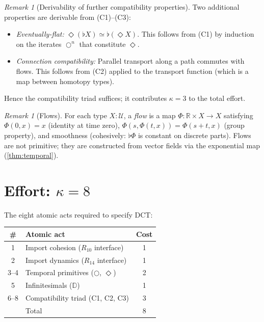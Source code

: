 \documentclass[11pt,a4paper]{article}
\theoremstyle{plain}
\theoremstyle{definition}
\theoremstyle{remark}
\newtheorem{remark}[theorem]{Remark}
\newcommand{\R}{\mathbb{R}}
\newcommand{\D}{\mathbb{D}}
\newcommand{\U}{\mathcal{U}}
\begin{document}
\begin{remark}[Derivability of further compatibility properties]
\label{rem:derivable}
Two additional properties are derivable from (C1)--(C3):
\begin{itemize}[nosep]
    \item \emph{Eventually-flat:} $\Diamond(\flat X) \simeq \flat(\Diamond X)$.
    This follows from (C1) by induction on the iterates $\bigcirc^n$ that constitute $\Diamond$.
    \item \emph{Connection compatibility:} Parallel transport along a path commutes with flows.
    This follows from (C2) applied to the transport function (which is a map between homotopy types).
\end{itemize}
Hence the compatibility triad suffices; it contributes $\kappa = 3$ to the total effort.
\end{remark}

\begin{remark}[Flows]
\label{rem:flows}
For each type $X : \U$, a \emph{flow} is a map $\Phi : \R \times X \to X$ satisfying $\Phi(0, x) = x$ (identity at time zero), $\Phi(s, \Phi(t, x)) = \Phi(s+t, x)$ (group property), and smoothness (cohesively: $\flat\Phi$ is constant on discrete parts).
Flows are not primitive; they are constructed from vector fields via the exponential map (\cref{thm:temporal}).
\end{remark}

\section{Effort: $\kappa = 8$}
\label{sec:kappa}

The eight atomic acts required to specify DCT:

\begin{center}
\begin{tabular}{@{}clc@{}}
\toprule
\# & Atomic act & Cost \\
\midrule
1 & Import cohesion ($R_{10}$ interface) & 1 \\
2 & Import dynamics ($R_{14}$ interface) & 1 \\
3--4 & Temporal primitives ($\bigcirc$, $\Diamond$) & 2 \\
5 & Infinitesimals ($\D$) & 1 \\
6--8 & Compatibility triad (C1, C2, C3) & 3 \\
\midrule
& Total & 8 \\
\bottomrule
\end{tabular}
\end{center}
\end{document}
